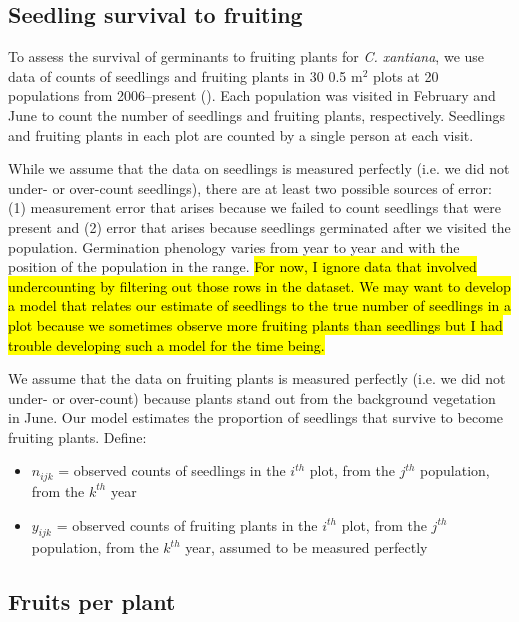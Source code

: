 \documentclass[12pt, oneside, titlepage]{article}   	%
\begin{document}
\subsection{Seedling survival to fruiting}

To assess the survival of germinants to fruiting plants for \textit{C. xantiana}, we use data of counts of seedlings and fruiting plants in 30 0.5 m$^2$ plots at 20 populations from 2006--present (\cite{eckhart2011}). Each population was visited in February and June to count the number of seedlings and fruiting plants, respectively. Seedlings and fruiting plants in each plot are counted by a single person at each visit. 

While we assume that the data on seedlings is measured perfectly (i.e. we did not under- or over-count seedlings), there are at least two possible sources of error: (1) measurement error that arises because we failed to count seedlings that were present and (2) error that arises because seedlings germinated after we visited the population. Germination phenology varies from year to year and with the position of the population in the range. \hl{For now, I ignore data that involved undercounting by filtering out those rows in the dataset. We may want to develop a model that relates our estimate of seedlings to the true number of seedlings in a plot because we sometimes observe more fruiting plants than seedlings but I had trouble developing such a model for the time being.}

We assume that the data on fruiting plants is measured perfectly (i.e. we did not under- or over-count) because plants stand out from the background vegetation in June. Our model estimates the proportion of seedlings that survive to become fruiting plants. Define:

\begin{itemize}
	\item $n_{ijk}$ = observed counts of seedlings in the $i^{th}$ plot, from the $j^{th}$ population, from the $k^{th}$ year
	\item $y_{ijk}$ = observed counts of fruiting plants in the $i^{th}$ plot, from the $j^{th}$ population, from the $k^{th}$ year, assumed to be measured perfectly
\end{itemize}

\subsection{Fruits per plant}
\end{document}
